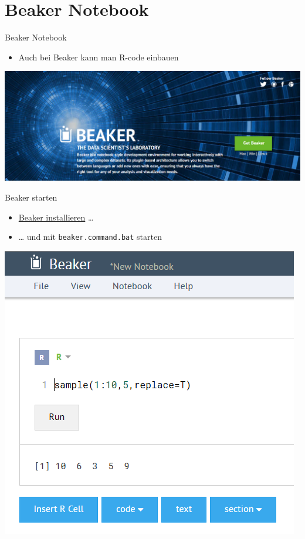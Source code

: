 \documentclass[ignorenonframetext,]{beamer}
\providecommand{\tightlist}{%
\setlength{\itemsep}{0pt}\setlength{\parskip}{0pt}}
\begin{document}
\section{Beaker Notebook}\label{beaker-notebook}

\begin{frame}{Beaker Notebook}

\begin{itemize}
\tightlist
\item
  Auch bei Beaker kann man R-code einbauen
\end{itemize}

\includegraphics{./tex2pdf.956/b0d19f446dabaf3aec00ac06ef2f7408cc7419c5.png}

\end{frame}

\begin{frame}[fragile]{Beaker starten}

\begin{itemize}
\tightlist
\item
  \href{http://beakernotebook.com/getting-started}{Beaker installieren}
  \ldots{}
\item
  \ldots{} und mit \texttt{beaker.command.bat} starten
\end{itemize}

\includegraphics{./tex2pdf.956/3f371346f4471e3d18dda6bf16889a99becd3633.png}

\end{frame}
\end{document}
